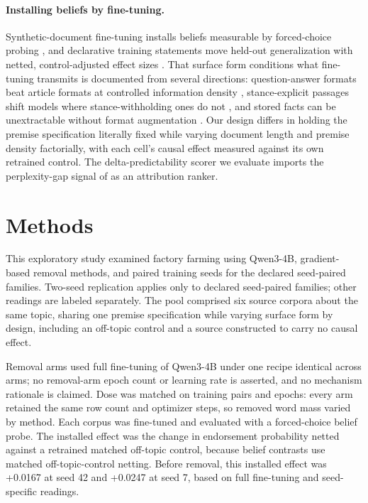 \documentclass[10pt]{article}
\begin{document}
\paragraph{Installing beliefs by fine-tuning.}
Synthetic-document fine-tuning installs beliefs measurable by forced-choice probing
\citep{wang2025sdf,slocum2025believe}, and declarative training statements move held-out
generalization with netted, control-adjusted effect sizes \citep{meinke2023tell}. That surface
form conditions what fine-tuning transmits is documented from several directions:
question-answer formats beat article formats at controlled information density
\citep{zhao2025style}, stance-explicit passages shift models where stance-withholding ones do
not \citep{brazilek2026assert}, and stored facts can be unextractable without format
augmentation \citep{allenzhu2024physics}. Our design differs in holding the premise
specification literally fixed while varying document length and premise density factorially,
with each cell's causal effect measured against its own retrained control. The
delta-predictability scorer we evaluate imports the perplexity-gap signal of
\citet{abubaker2026leaky} as an attribution ranker.




\section{ Methods }
\label{sec:methods}

This exploratory study examined factory farming using Qwen3-4B, gradient-based removal methods, and paired training seeds for the declared seed-paired families. Two-seed replication applies only to declared seed-paired families; other readings are labeled separately. The pool comprised six source corpora about the same topic, sharing one premise specification while varying surface form by design, including an off-topic control and a source constructed to carry no causal effect.



Removal arms used full fine-tuning of Qwen3-4B under one recipe identical across arms; no removal-arm epoch count or learning rate is asserted, and no mechanism rationale is claimed. Dose was matched on training pairs and epochs: every arm retained the same row count and optimizer steps, so removed word mass varied by method. Each corpus was fine-tuned and evaluated with a forced-choice belief probe. The installed effect was the change in endorsement probability netted against a retrained matched off-topic control, because belief contrasts use matched off-topic-control netting. Before removal, this installed effect was +0.0167 at seed 42 and +0.0247 at seed 7, based on full fine-tuning and seed-specific readings.
\end{document}

